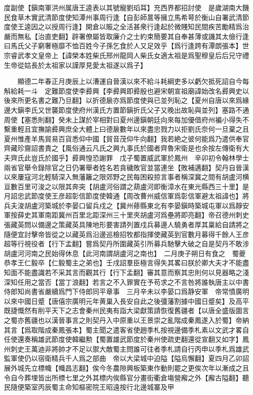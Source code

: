 度副使【鎭南軍洪州属唐王逵表以其號寵劉瑫耳】充西界都招討使　是歲湖南大饑民食草木實武清節度使知潭州事周行逢【自彭師暠等擁立馬希萼於衡山自署武清節度使王逵因之以授周行逢】開倉以賑之全活甚衆行逢起於微賤知民間疾苦勵精爲治嚴而無私【治直吏翻】辟署僚屬皆取廉介之士約束簡要其自奉甚薄或譏其太儉行逢曰馬氏父子窮奢極靡不恤百姓今子孫乞食於人又足效乎【爲行逢跨有潭朗張本】世宗睿武孝文皇帝上【諱榮本姓柴氏邢州龍岡人柴氏女適太祖是爲聖穆皇后后兄守禮生帝從姑長於太祖家以謹厚見愛太祖遂以爲子】

　　顯德二年春正月庚辰上以漕運自晉漢以來不給斗耗綱吏多以虧欠抵死詔自今每斛給耗一斗　定難節度使李彛興【李彛興即彛殷也避宋朝宣祖廟諱始改名彛興史以後來所更名書之難乃旦翻】以折德扆亦爲節度使與已並列恥之【夏州自唐以來爲緣邊大鎭李氏又世襲節度使府州漢氏方置節鎭折氏父子又晚出故恥與並列】塞路不通周使【塞悉則翻】癸未上謀於宰相對曰夏州邊鎭朝廷向來每加優借府州褊小得失不繫重輕且宜撫諭彛興庶全大體上曰德扆數年以來盡忠戮力以拒劉氏奈何一旦棄之且夏州惟產羊馬貿易百貨悉仰中國【貿音茂仰牛向翻】我若絶之彼何能爲乃遣供奉官齊藏珍齎詔書責之【風俗通云凡氏之興九事氏於國者齊魯宋衛是也余按左傳衛有大夫齊氏此豈氏於國乎】彛興惶恐謝罪　戊子蜀置威武軍於鳳州　辛卯初令翰林學士兩省官舉令錄除官之日仍署舉者姓名若貪穢敗官並當連坐【敗補邁翻】契丹自晉漢以來屢寇河北輕騎深入無藩籬之限郊野之民每困殺掠言事者稱深冀之間有胡盧河横亘數百里可浚之以限其奔突【胡盧河俗謂之葫盧河即衡漳水在東光縣西三十里】是月詔忠武節度使王彦超彰信節度使韓通【周改曹州威信軍爲彰信軍避太祖諱也】將兵夫浚胡盧河築城於李晏口留兵戍之【冀州蓚縣東北有李晏鎭時築城屯軍以爲靜安軍按薛史其軍南距冀州百里北距深州三十里夾胡盧河爲壘將即亮翻】帝召德州刺史張藏英問以備邊之策藏英具陳地形要害請列置戍兵募邊人驍勇者厚其稟給自請將之隨便宜討擊帝皆從之以藏英爲沿邊巡檢招牧都指揮使藏英到官數月募得千餘人王彦超等行視役者【行下孟翻】嘗爲契丹所圍藏英引所募兵馳擊大破之自是契丹不敢涉胡盧河河南之民始得休息【此河南謂胡盧河之南也】　二月庚子朔日有食之　蜀夔恭孝王仁毅卒【仁毅蜀主之弟也】壬戌詔羣臣極言得失其畧曰朕於卿大夫才不能盡知面不能盡識若不采其言而觀其行【行下孟翻】審其意而察其忠則何以見器略之淺深知任用之當否【當丁浪翻】若言之不入罪實在予苟求之不言咎將誰執唐主以中書侍郎知尚書省嚴續爲門下侍郎同平章事　三月辛未以李晏口爲静安軍　帝常憤廣明以來中國日蹙【唐僖宗廣明元年黄巢入長安自此之後彊藩割據中國日蹙矣】及高平既捷慨然有削平天下之志會秦州民夷有詣大梁獻策請恢復舊疆者【以唐全盛版圖言之蜀亦舊疆也以漢晉事言之則契丹入中原重以王景崇之亂階成秦鳳遂入於蜀】帝納其言【爲取階成秦鳳張本】蜀主聞之遣客省使趙季札按視邊備季札素以文武才畧自任使還奏稱雄武節度使韓繼勲【蜀置雄武節度於秦州使疏吏翻還從宣翻又如字】鳳州刺史王萬迪非將帥才不足以禦大敵蜀主問誰可往者季札請自行丙申以季札爲雄武監軍使仍以宿衛精兵千人爲之部曲　帝以大梁城中迫隘【隘烏懈翻】夏四月乙卯詔展外城先立標幟【幟昌志翻】俟今冬農隙興板築東作動則罷之更俟次年以漸成之且令自今葬埋皆出所標七里之外其標内俟縣官分畫街衢倉塲營廨之外【廨古隘翻】聽民隨便築室丙辰蜀主命知樞密院王昭遠按行北邊城寨及甲

